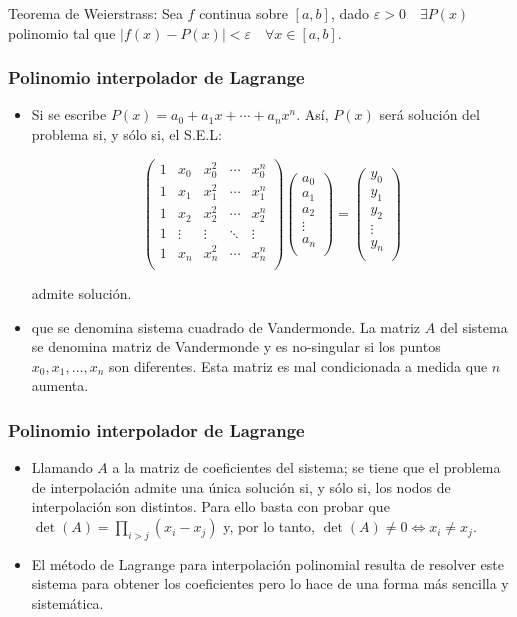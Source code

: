 \documentclass[10pt]{beamer}
\begin{document}
\frame
{
\begin{block}{Teorema de Weierstrass:}
Sea $f$ continua sobre $[a,b]$, dado $\varepsilon > 0 \quad \exists P(x)$ polinomio tal que $\mid f(x)-P(x)\mid < \varepsilon \quad \forall x\in [a,b]$.
\end{block}
}
\frame
{
\frametitle{Polinomio interpolador de Lagrange}
\begin{itemize}
\item Si se escribe $P(x) = a_0 + a_1x + \cdots + a_nx^n$. As\'i, $P(x)$ ser\'a soluci\'on del problema si, y s\'olo si, el S.E.L:
\begin{block}{}
$$
\left(
\begin{array}{ccccc}
 1 & x_0 & x_0^2 & \cdots & x_0^n\\
 1 & x_1 & x_1^2 & \cdots & x_1^n\\
 1 & x_2 & x_2^2 & \cdots & x_2^n\\
 1 & \vdots & \vdots & \ddots & \vdots\\
 1 & x_n & x_n^2 & \cdots & x_n^n\\
\end{array}\right)
\left(
\begin{array}{c}
 a_0\\
 a_1\\
 a_2\\
 \vdots\\
 a_n\\
\end{array}\right) =
\left(
\begin{array}{c}
 y_0\\
 y_1\\
 y_2\\
 \vdots\\
 y_n\\
\end{array}
\right)
$$
\end{block}
admite soluci\'on.

\item<2-> que se denomina sistema cuadrado de Vandermonde. La matriz $A$ del sistema se denomina matriz de Vandermonde y es no-singular si los puntos $x_0, x_1, \ldots , x_n$ son diferentes. Esta matriz es mal condicionada a medida que $n$ aumenta.
\end{itemize}
}
\begin{frame}
  \frametitle{Polinomio interpolador de Lagrange}
  \begin{itemize}
    \item Llamando $A$ a la matriz de coeficientes del sistema; se tiene que el problema de interpolaci\'on admite una \'unica soluci\'on si, y s\'olo si, los nodos de interpolaci\'on son distintos. Para ello basta con probar que $\det(A) = \prod_{i>j}(x_i-x_j)$ y, por lo tanto, $\det(A) \neq 0 \Leftrightarrow x_i \neq x_j$.
    \item<2-> El m\'etodo de Lagrange para interpolaci\'on polinomial resulta de resolver este sistema para obtener los coeficientes pero lo hace de una forma m\'as sencilla y sistem\'atica. 
  \end{itemize}
\end{frame}
\end{document}
